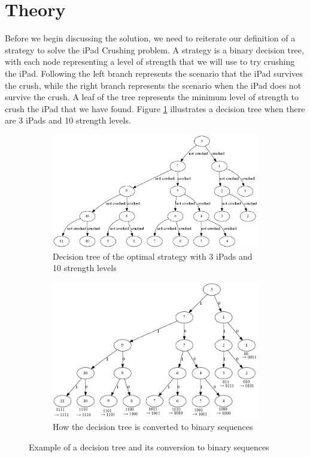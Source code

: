 \documentclass[12pt,a4paper,oneside]{report}
\begin{document}
\section{Theory}
Before we begin discussing the solution, we need to reiterate our definition of a strategy to solve the iPad Crushing problem. A strategy is a binary decision tree, with each node representing a level of strength that we will use to try crushing the iPad. Following the left branch represents the scenario that the iPad survives the crush, while the right branch represents the scenario when the iPad does not survive the crush. A leaf of the tree represents the minimum level of strength to crush the iPad that we have found. Figure \ref{fig:comb-original} illustrates a decision tree when there are 3 iPads and 10 strength levels.

\begin{figure}
	\centering
	\begin{subfigure}{1.0\textwidth}
		\includegraphics[width=\textwidth]{comb-original}
		\caption{Decision tree of the optimal strategy with 3 iPads and 10 strength levels}
		\label{fig:comb-original}
	\end{subfigure}
	\begin{subfigure}{1.0\textwidth}
		\includegraphics[width=\textwidth]{comb-binary-sequence}
		\caption{How the decision tree is converted to binary sequences}
		\label{fig:comb-binary-sequence}
	\end{subfigure}
	\caption{Example of a decision tree and its conversion to binary sequences}
\end{figure}
\end{document}
